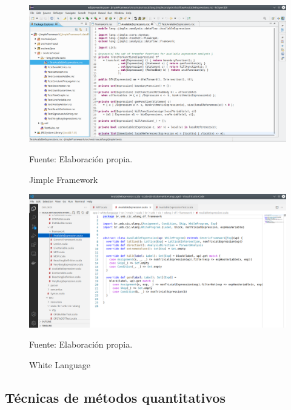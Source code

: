 \documentclass[12pt]{article}
\begin{document}
\begin{figure}[!ht]
	\begin{center}
		\includegraphics[width=1\textwidth]{images/jimple_framework}
	\end{center}
	\begin{center}
		\vskip -0.5cm
		\caption{\label{figure:jimple_framework}
			\small{Jimple Framework}}
		{\small{Fuente: Elaboración propia.}}
	\end{center}
\end{figure}

\begin{figure}[!ht]
	\begin{center}
		\includegraphics[width=1\textwidth]{images/while_lang}
	\end{center}
	\begin{center}
		\vskip -0.5cm
		\caption{\label{figure:while_lang}
			\small{White Language}}
		{\small{Fuente: Elaboración propia.}}
	\end{center}
\end{figure}


\subsection{Técnicas de métodos quantitativos}
\end{document}
